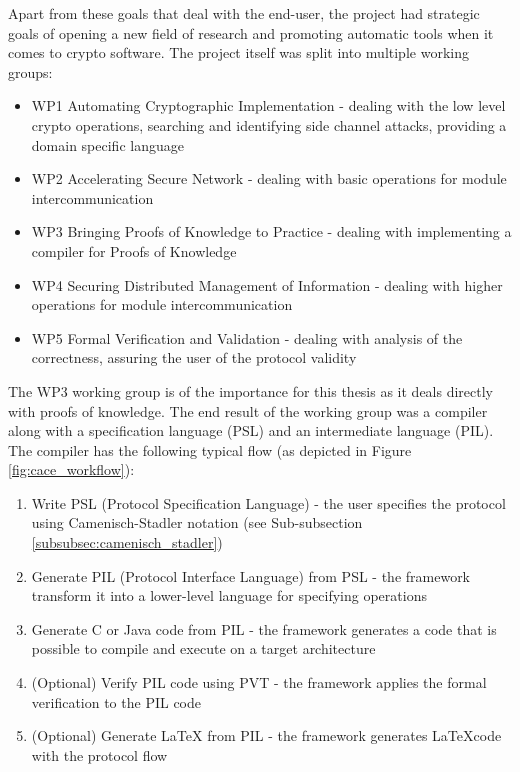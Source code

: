Apart from these goals that deal with the end-user, the project had
strategic goals of opening a new field of research and promoting
automatic tools when it comes to crypto software. The project itself
was split into multiple working groups:
\begin{itemize}
\item WP1 Automating Cryptographic Implementation - dealing with the
  low level crypto operations, searching and identifying side channel
  attacks, providing a domain specific language
\item WP2 Accelerating Secure Network - dealing with basic operations
  for module intercommunication
\item WP3 Bringing Proofs of Knowledge to Practice - dealing with
  implementing a compiler for Proofs of Knowledge
\item WP4 Securing Distributed Management of Information - dealing
  with higher operations for module intercommunication
\item WP5 Formal Verification and Validation - dealing with analysis
  of the correctness, assuring the user of the protocol validity
\end{itemize}

The WP3 working group is of the importance for this thesis as it deals
directly with proofs of knowledge. The end result of the working group
was a compiler along with a specification language (PSL) and an
intermediate language (PIL). The compiler has the following typical
flow (as depicted in Figure \ref{fig:cace_workflow}):
\begin{enumerate}
\item Write PSL (Protocol Specification Language) - the user specifies the
  protocol using Camenisch-Stadler notation (see Sub-subsection
  \ref{subsubsec:camenisch_stadler})
\item Generate PIL (Protocol Interface Language) from PSL - the
  framework transform it into a lower-level language for specifying
  operations
\item Generate C or Java code from PIL - the framework generates a
  code that is possible to compile and execute on a target
  architecture
\item (Optional) Verify PIL code using PVT - the framework applies the
  formal verification to the PIL code
\item (Optional) Generate LaTeX from PIL - the framework generates
  \LaTeX code with the protocol flow
\end{enumerate}

